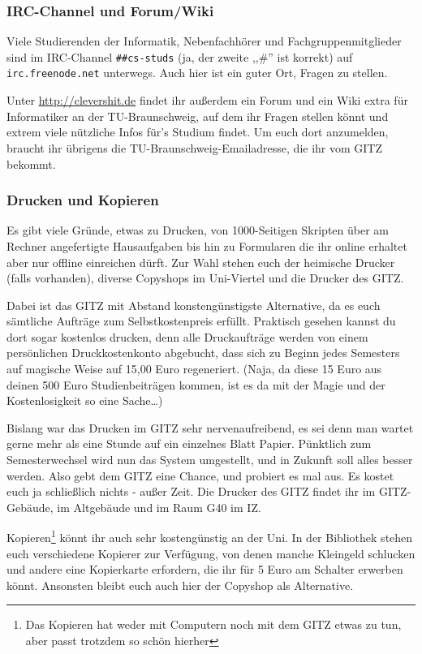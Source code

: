 \begin{multicols}{2}
	\subsubsection{IRC-Channel und Forum/Wiki}
		Viele Studierenden der Informatik, Nebenfachhörer und Fachgruppenmitglieder sind im IRC-Channel \texttt{\#\#cs-studs} (ja, der zweite ,,\#'' ist korrekt) auf \texttt{irc.freenode.net} unterwegs. Auch hier ist ein guter Ort, Fragen zu stellen.

		Unter \url{http://clevershit.de} findet ihr außerdem ein Forum und ein Wiki extra für Informatiker an der TU-Braunschweig, auf dem ihr Fragen stellen könnt und extrem viele nützliche Infos für's Studium findet. Um euch dort anzumelden, braucht ihr übrigens die TU-Braunschweig-Emailadresse, die ihr vom GITZ bekommt.

	\subsubsection{Drucken und Kopieren}
		\label{kopieren}
		Es gibt viele Gründe, etwas zu Drucken, von 1000-Seitigen Skripten über am Rechner angefertigte Hausaufgaben bis hin zu Formularen die ihr online erhaltet aber nur offline einreichen dürft. Zur Wahl stehen euch der heimische Drucker (falls vorhanden), diverse Copyshops im Uni-Viertel und die Drucker des GITZ.

		Dabei ist das GITZ mit Abstand konstengünstigste Alternative, da es euch sämtliche Aufträge zum Selbstkostenpreis erfüllt. Praktisch gesehen kannst du dort sogar kostenlos drucken, denn alle Druckaufträge werden von einem persönlichen Druckkostenkonto abgebucht, dass sich zu Beginn jedes Semesters auf magische Weise auf 15,00 Euro regeneriert. (Naja, da diese 15 Euro aus deinen 500 Euro Studienbeiträgen kommen, ist es da mit der Magie und der Kostenlosigkeit so eine Sache\ldots)

		Bislang war das Drucken im GITZ sehr nervenaufreibend, es sei denn man wartet gerne mehr als eine Stunde auf ein einzelnes Blatt Papier. Pünktlich zum Semesterwechsel wird nun das System umgestellt, und in Zukunft soll alles besser werden. Also gebt dem GITZ eine Chance, und probiert es mal aus. Es kostet euch ja schließlich nichts - außer Zeit. Die Drucker des GITZ findet ihr im GITZ-Gebäude, im Altgebäude und im Raum G40 im IZ.

		Kopieren\footnote{Das Kopieren hat weder mit Computern noch mit dem GITZ etwas zu tun, aber passt trotzdem so schön hierher} könnt ihr auch sehr kostengünstig an der Uni. In der Bibliothek stehen euch verschiedene Kopierer zur Verfügung, von denen manche Kleingeld schlucken und andere eine Kopierkarte erfordern, die ihr für 5 Euro am Schalter erwerben könnt. Ansonsten bleibt euch auch hier der Copyshop als Alternative.


\end{multicols}

